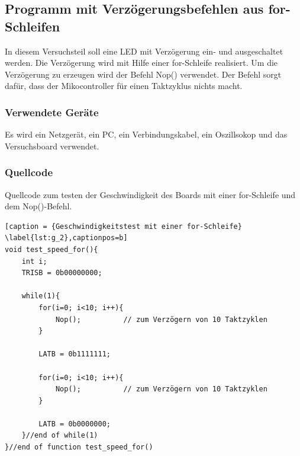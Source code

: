 \documentclass[12pt,a4paper]{article}
\begin{document}
\subsection{Programm mit Verzögerungsbefehlen aus for-Schleifen}

In diesem Versuchsteil soll eine LED  mit Verzögerung ein- und ausgeschaltet werden. Die Verzögerung wird mit Hilfe einer for-Schleife realisiert. Um die Verzögerung zu erzeugen wird der Befehl Nop() verwendet. Der Befehl sorgt dafür, dass der Mikocontroller für einen Taktzyklus nichts macht.

\subsubsection*{Verwendete Geräte}

Es wird ein Netzgerät, ein PC, ein Verbindungskabel, ein Oszillsokop und das Versuchsboard verwendet.


\subsubsection*{Quellcode}

Quellcode zum testen der Geschwindigkeit des Boards mit einer for-Schleife und dem Nop()-Befehl.

\lstset{language=C, basicstyle=\tiny}
\begin{lstlisting}[caption = {Geschwindigkeitstest mit einer for-Schleife} \label{lst:g_2},captionpos=b]
void test_speed_for(){
	int i;
	TRISB = 0b00000000;
	
	while(1){
		for(i=0; i<10; i++){
			Nop();			// zum Verzögern von 10 Taktzyklen
		}
	
		LATB = 0b1111111;
		
		for(i=0; i<10; i++){
			Nop();			// zum Verzögern von 10 Taktzyklen
		}
		
		LATB = 0b0000000;
	}//end of while(1)
}//end of function test_speed_for()
\end{lstlisting}
\end{document}
